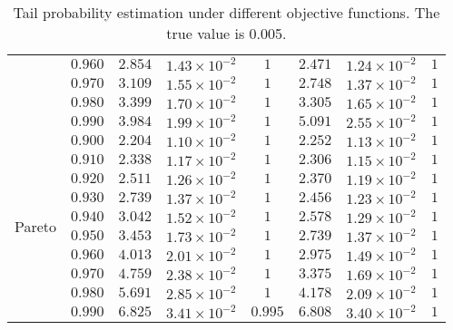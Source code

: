 \begin{table}[ht]
{\begin{tabular}{cc|ccc|ccc}
&$0.960$ & $2.854$ & $1.43\times 10^{-2}$ & $ 1$ & $2.471$ & $1.24\times 10^{-2}$ & $ 1$\\
&$0.970$ & $3.109$ & $1.55\times 10^{-2}$ & $ 1$ & $2.748$ & $1.37\times 10^{-2}$ & $ 1$\\
&$0.980$ & $3.399$ & $1.70\times 10^{-2}$ & $ 1$ & $3.305$ & $1.65\times 10^{-2}$ & $ 1$\\
&$0.990$ & $3.984$ & $1.99\times 10^{-2}$ & $ 1$ & $5.091$ & $2.55\times 10^{-2}$ & $ 1$\\\hline 
\multirow{10}{*}{Pareto}&$0.900$ & $2.204$ & $1.10\times 10^{-2}$ & $ 1$ & $2.252$ & $1.13\times 10^{-2}$ & $ 1$\\
&$0.910$ & $2.338$ & $1.17\times 10^{-2}$ & $ 1$ & $2.306$ & $1.15\times 10^{-2}$ & $ 1$\\
&$0.920$ & $2.511$ & $1.26\times 10^{-2}$ & $ 1$ & $2.370$ & $1.19\times 10^{-2}$ & $ 1$\\
&$0.930$ & $2.739$ & $1.37\times 10^{-2}$ & $ 1$ & $2.456$ & $1.23\times 10^{-2}$ & $ 1$\\
&$0.940$ & $3.042$ & $1.52\times 10^{-2}$ & $ 1$ & $2.578$ & $1.29\times 10^{-2}$ & $ 1$\\
&$0.950$ & $3.453$ & $1.73\times 10^{-2}$ & $ 1$ & $2.739$ & $1.37\times 10^{-2}$ & $ 1$\\
&$0.960$ & $4.013$ & $2.01\times 10^{-2}$ & $ 1$ & $2.975$ & $1.49\times 10^{-2}$ & $ 1$\\
&$0.970$ & $4.759$ & $2.38\times 10^{-2}$ & $ 1$ & $3.375$ & $1.69\times 10^{-2}$ & $ 1$\\
&$0.980$ & $5.691$ & $2.85\times 10^{-2}$ & $ 1$ & $4.178$ & $2.09\times 10^{-2}$ & $ 1$\\
&$0.990$ & $6.825$ & $3.41\times 10^{-2}$ & $0.995$ & $6.808$ & $3.40\times 10^{-2}$ & $ 1$\\
    \hline
    \bottomrule
    \end{tabular}}\caption{Tail probability estimation under different objective functions. The true value is 0.005.}
    \label{tb4_tpe_0.7}
\end{table}